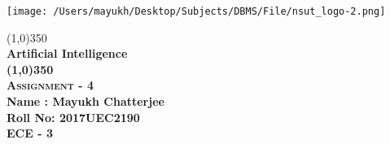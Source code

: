 \documentclass {article}
\begin{document}
\begin{titlepage}
	
	\centering
	\texttt{[image: /Users/mayukh/Desktop/Subjects/DBMS/File/nsut\_logo-2.png]}
	
	\begin{center}
	\line(1,0){350} \\
	\huge\bfseries Artificial Intelligence\\
	
	\line(1,0){350} \\
	\textsc{\Large Assignment - 4}\\ 
	[0.2 cm]
	
	\Large\bfseries Name : Mayukh Chatterjee \\
	\Large\bfseries Roll No: 2017UEC2190 \\
	ECE - 3

	\end{center}
	
\end{titlepage}
\end{document}
